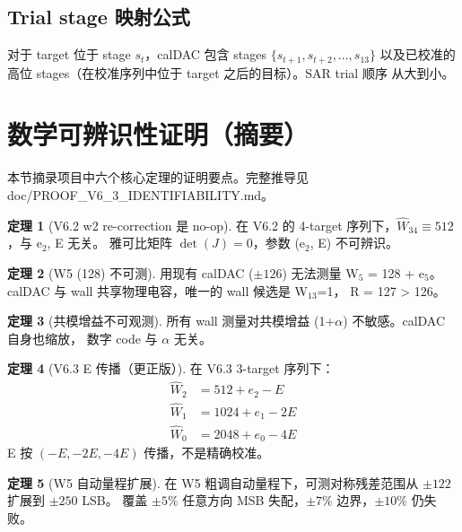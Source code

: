 \documentclass[UTF8,a4paper,12pt]{ctexart}
\theoremstyle{definition}
\newtheorem{theorem}{定理}[section]
\begin{document}
\subsection{Trial stage 映射公式}

对于 target 位于 stage $s_t$，calDAC 包含 stages $\{s_{t+1}, s_{t+2}, \ldots, s_{13}\}$
以及已校准的高位 stages（在校准序列中位于 target 之后的目标）。SAR trial 顺序
从大到小。

\section{数学可辨识性证明（摘要）}

本节摘录项目中六个核心定理的证明要点。完整推导见
doc/PROOF\_V6\_3\_IDENTIFIABILITY.md。

\begin{theorem}[V6.2 w2 re-correction 是 no-op]
在 V6.2 的 4-target 序列下，$\hat W_{34} \equiv 512$，与 e$_2$, E 无关。
雅可比矩阵 $\det(J) = 0$，参数 (e$_2$, E) 不可辨识。
\end{theorem}

\begin{theorem}[W5 (128) 不可测]
用现有 calDAC ($\pm 126$) 无法测量 W$_5$ = 128 + e$_5$。
calDAC 与 wall 共享物理电容，唯一的 wall 候选是 W$_{13}$=1，
R = 127 > 126。
\end{theorem}

\begin{theorem}[共模增益不可观测]
所有 wall 测量对共模增益 (1+$\alpha$) 不敏感。calDAC 自身也缩放，
数字 code 与 $\alpha$ 无关。
\end{theorem}

\begin{theorem}[V6.3 E 传播（更正版）]
在 V6.3 3-target 序列下：
\begin{align*}
\hat W_2 &= 512 + e_2 - E \\
\hat W_1 &= 1024 + e_1 - 2E \\
\hat W_0 &= 2048 + e_0 - 4E
\end{align*}
E 按 $(-E, -2E, -4E)$ 传播，不是精确校准。
\end{theorem}

\begin{theorem}[W5 自动量程扩展]
在 W5 粗调自动量程下，可测对称残差范围从 $\pm 122$ 扩展到 $\pm 250$ LSB。
覆盖 $\pm 5\%$ 任意方向 MSB 失配，$\pm 7\%$ 边界，$\pm 10\%$ 仍失败。
\end{theorem}
\end{document}
